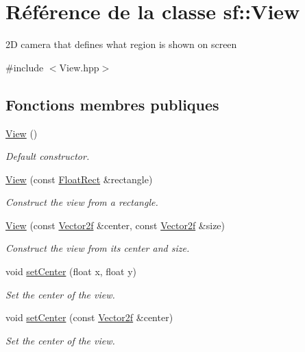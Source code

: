 \hypertarget{classsf_1_1View}{}\section{Référence de la classe sf\+:\+:View}
\label{classsf_1_1View}


2D camera that defines what region is shown on screen  




{\ttfamily \#include $<$View.\+hpp$>$}

\subsection*{Fonctions membres publiques}
\begin{DoxyCompactItemize}
\item 
\hyperlink{classsf_1_1View_a28c38308ff089ae5bdacd001d12286d3}{View} ()
\begin{DoxyCompactList}\small\item\em Default constructor. \end{DoxyCompactList}\item 
\hyperlink{classsf_1_1View_a1d63bc49e041b3b1ff992bb6430e1326}{View} (const \hyperlink{classsf_1_1Rect}{Float\+Rect} \&rectangle)
\begin{DoxyCompactList}\small\item\em Construct the view from a rectangle. \end{DoxyCompactList}\item 
\hyperlink{classsf_1_1View_afdaf84cfc910ef160450d63603457ea4}{View} (const \hyperlink{classsf_1_1Vector2}{Vector2f} \&center, const \hyperlink{classsf_1_1Vector2}{Vector2f} \&size)
\begin{DoxyCompactList}\small\item\em Construct the view from its center and size. \end{DoxyCompactList}\item 
void \hyperlink{classsf_1_1View_aa8e3fedb008306ff9811163545fb75f2}{set\+Center} (float x, float y)
\begin{DoxyCompactList}\small\item\em Set the center of the view. \end{DoxyCompactList}\item 
void \hyperlink{classsf_1_1View_ab0296b03793e0873e6ae9e15311f3e78}{set\+Center} (const \hyperlink{classsf_1_1Vector2}{Vector2f} \&center)
\begin{DoxyCompactList}\small\item\em Set the center of the view. \end{DoxyCompactList}\item 

\end{DoxyCompactItemize}
